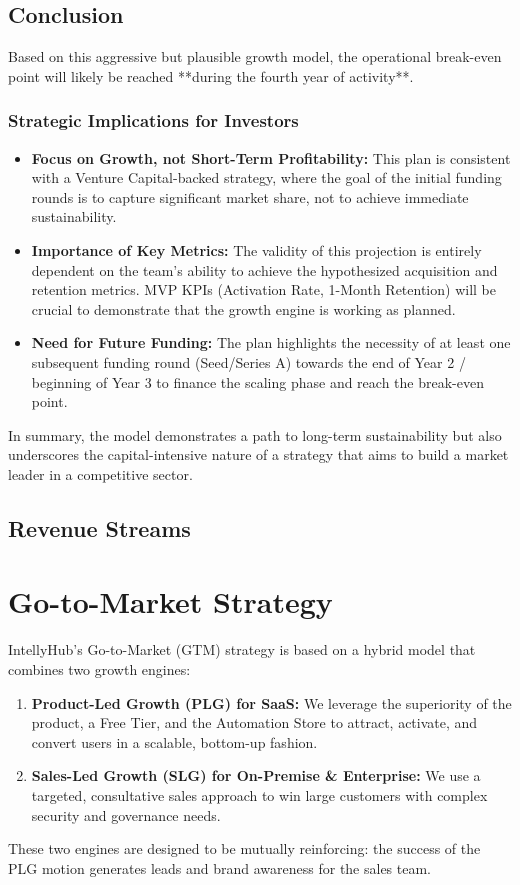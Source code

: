 \documentclass[11pt, a4paper, oneside]{article}
\begin{document}
\subsection{Conclusion}
Based on this aggressive but plausible growth model, the operational break-even point will likely be reached **during the fourth year of activity**.

\subsubsection*{Strategic Implications for Investors}
\begin{itemize}
    \item \textbf{Focus on Growth, not Short-Term Profitability:} This plan is consistent with a Venture Capital-backed strategy, where the goal of the initial funding rounds is to capture significant market share, not to achieve immediate sustainability.
    \item \textbf{Importance of Key Metrics:} The validity of this projection is entirely dependent on the team's ability to achieve the hypothesized acquisition and retention metrics. MVP KPIs (Activation Rate, 1-Month Retention) will be crucial to demonstrate that the growth engine is working as planned.
    \item \textbf{Need for Future Funding:} The plan highlights the necessity of at least one subsequent funding round (Seed/Series A) towards the end of Year 2 / beginning of Year 3 to finance the scaling phase and reach the break-even point.
\end{itemize}
In summary, the model demonstrates a path to long-term sustainability but also underscores the capital-intensive nature of a strategy that aims to build a market leader in a competitive sector.


\subsection{Revenue Streams}


\section{Go-to-Market Strategy}

IntellyHub's Go-to-Market (GTM) strategy is based on a hybrid model that combines two growth engines:
\begin{enumerate}
    \item \textbf{Product-Led Growth (PLG) for SaaS:} We leverage the superiority of the product, a Free Tier, and the Automation Store to attract, activate, and convert users in a scalable, bottom-up fashion.
    \item \textbf{Sales-Led Growth (SLG) for On-Premise \& Enterprise:} We use a targeted, consultative sales approach to win large customers with complex security and governance needs.
\end{enumerate}
These two engines are designed to be mutually reinforcing: the success of the PLG motion generates leads and brand awareness for the sales team.
\end{document}
